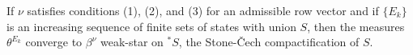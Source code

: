 If $\nu$ satisfies conditions (1), (2), and (3) for an admissible row vector and if $\{E_k\}$ is an increasing sequence of finite sets of states with union $S$, then the measures $\theta^{E_k}$ converge to $\beta^\nu$ weak-star on ${}^*S$, the Stone-Čech compactification of $S$.

